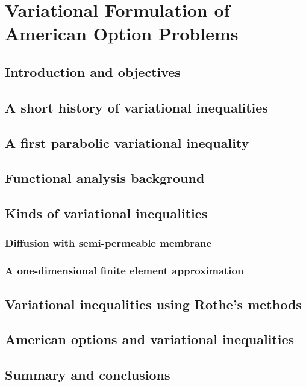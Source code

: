 \chapter{Variational Formulation of American Option Problems}

\section{Introduction and objectives}

\section{A short history of variational inequalities}

\section{A first parabolic variational inequality}

\section{Functional analysis background}

\section{Kinds of variational inequalities}

\subsection{Diffusion with semi-permeable membrane}

\subsection{A one-dimensional finite element approximation}

\section{Variational inequalities using Rothe’s methods}

\section{American options and variational inequalities}

\section{Summary and conclusions}